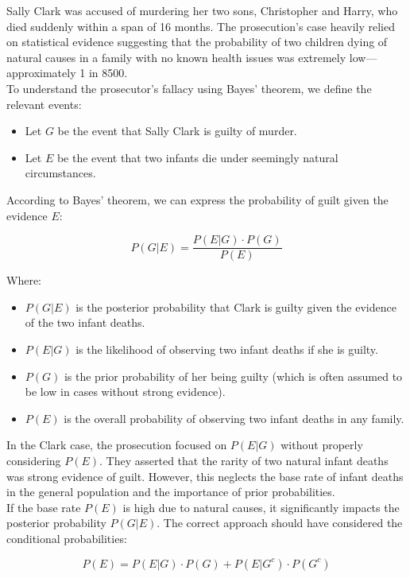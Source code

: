 Sally Clark was accused of murdering her two sons, Christopher and Harry, who died suddenly within a span of 16 months. The prosecution's case heavily relied on statistical evidence suggesting that the probability of two children dying of natural causes in a family with no known health issues was extremely low—approximately 1 in 8500.\\

To understand the prosecutor's fallacy using Bayes' theorem, we define the relevant events:

\begin{itemize}
    \item Let \( G \) be the event that Sally Clark is guilty of murder.
    \item Let \( E \) be the event that two infants die under seemingly natural circumstances.
\end{itemize}

According to Bayes' theorem, we can express the probability of guilt given the evidence \( E \):

\[
P(G|E) = \frac{P(E|G) \cdot P(G)}{P(E)}
\]

Where:
\begin{itemize}
    \item \( P(G|E) \) is the posterior probability that Clark is guilty given the evidence of the two infant deaths.
    \item \( P(E|G) \) is the likelihood of observing two infant deaths if she is guilty.
    \item \( P(G) \) is the prior probability of her being guilty (which is often assumed to be low in cases without strong evidence).
    \item \( P(E) \) is the overall probability of observing two infant deaths in any family.
\end{itemize}

In the Clark case, the prosecution focused on \( P(E|G) \) without properly considering \( P(E) \). They asserted that the rarity of two natural infant deaths was strong evidence of guilt. However, this neglects the base rate of infant deaths in the general population and the importance of prior probabilities. \\

If the base rate \( P(E) \) is high due to natural causes, it significantly impacts the posterior probability \( P(G|E) \). The correct approach should have considered the conditional probabilities:

\[
P(E) = P(E|G) \cdot P(G) + P(E|G^c) \cdot P(G^c)
\]

